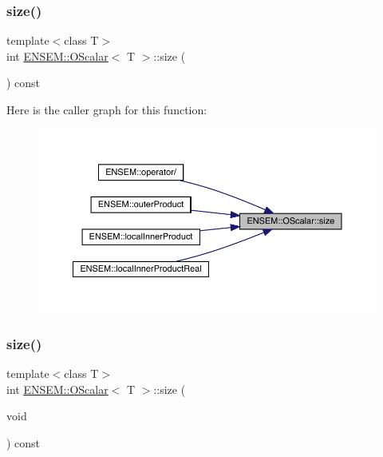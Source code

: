 \mbox{\label{classENSEM_1_1OScalar_a2029adc2feeab03e85a091ab6878fc2d}} 
\subsubsection{\texorpdfstring{size()}{size()}\hspace{0.1cm}{\footnotesize\ttfamily [1/3]}}
{\footnotesize\ttfamily template$<$class T$>$ \\
int \mbox{\hyperlink{classENSEM_1_1OScalar}{E\+N\+S\+E\+M\+::\+O\+Scalar}}$<$ T $>$\+::size (\begin{DoxyParamCaption}{ }\end{DoxyParamCaption}) const\hspace{0.3cm}{\ttfamily [inline]}}

Here is the caller graph for this function\+:
\nopagebreak
\begin{figure}[H]
\begin{center}
\leavevmode
\includegraphics[width=350pt]{da/d80/classENSEM_1_1OScalar_a2029adc2feeab03e85a091ab6878fc2d_icgraph}
\end{center}
\end{figure}
\mbox{\label{classENSEM_1_1OScalar_a2029adc2feeab03e85a091ab6878fc2d}} 
\subsubsection{\texorpdfstring{size()}{size()}\hspace{0.1cm}{\footnotesize\ttfamily [2/3]}}
{\footnotesize\ttfamily template$<$class T$>$ \\
int \mbox{\hyperlink{classENSEM_1_1OScalar}{E\+N\+S\+E\+M\+::\+O\+Scalar}}$<$ T $>$\+::size (\begin{DoxyParamCaption}\item[{void}]{ }\end{DoxyParamCaption}) const\hspace{0.3cm}{\ttfamily [inline]}}

